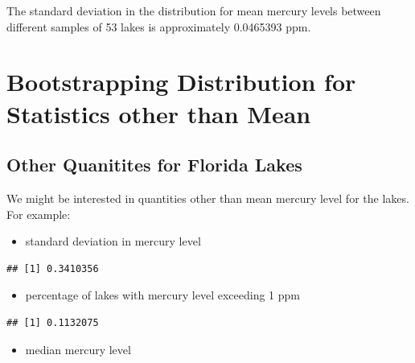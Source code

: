 \documentclass[]{book}
\newenvironment{Shaded}{\begin{snugshade}}{\end{snugshade}}
\newcommand{\KeywordTok}[1]{\textcolor[rgb]{0.13,0.29,0.53}{\textbf{#1}}}
\newcommand{\DecValTok}[1]{\textcolor[rgb]{0.00,0.00,0.81}{#1}}
\newcommand{\OperatorTok}[1]{\textcolor[rgb]{0.81,0.36,0.00}{\textbf{#1}}}
\newcommand{\NormalTok}[1]{#1}
\providecommand{\tightlist}{%
  \setlength{\itemsep}{0pt}\setlength{\parskip}{0pt}}
\begin{document}
The standard deviation in the distribution for mean mercury levels
between different samples of 53 lakes is approximately 0.0465393 ppm.

\section{Bootstrapping Distribution for Statistics other than
Mean}\label{bootstrapping-distribution-for-statistics-other-than-mean}

\subsection{Other Quanitites for Florida
Lakes}\label{other-quanitites-for-florida-lakes}

We might be interested in quantities other than mean mercury level for
the lakes. For example:

\begin{itemize}
\tightlist
\item
  standard deviation in mercury level
\end{itemize}

\begin{Shaded}
\end{Shaded}

\begin{verbatim}
## [1] 0.3410356
\end{verbatim}

\begin{itemize}
\tightlist
\item
  percentage of lakes with mercury level exceeding 1 ppm
\end{itemize}

\begin{Shaded}
\end{Shaded}

\begin{verbatim}
## [1] 0.1132075
\end{verbatim}

\begin{itemize}
\tightlist
\item
  median mercury level
\end{itemize}
\end{document}
